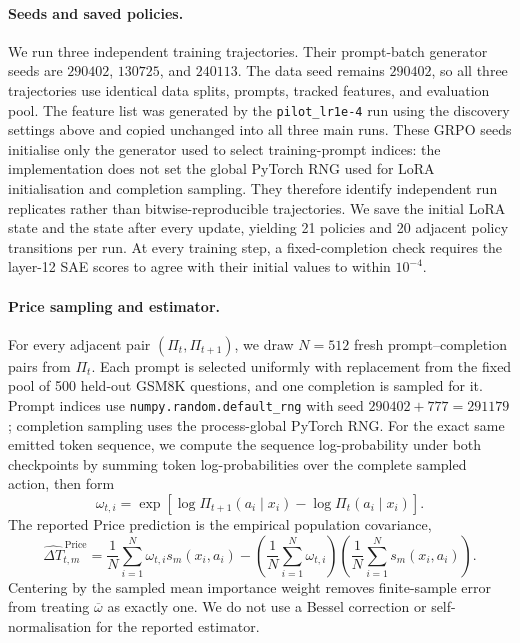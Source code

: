 \paragraph{Seeds and saved policies.}
We run three independent training trajectories.  Their prompt-batch generator
seeds are $290402$, $130725$, and $240113$.  The data seed remains $290402$,
so all three trajectories use identical data splits, prompts, tracked
features, and evaluation pool.  The feature list was generated by the
\texttt{pilot\_lr1e-4} run using the discovery settings above and copied
unchanged into all three main runs.  These GRPO seeds initialise only the
generator used to select training-prompt indices: the implementation does not
set the global PyTorch RNG used for LoRA initialisation and completion
sampling.  They therefore identify independent run replicates rather than
bitwise-reproducible trajectories.  We save the initial LoRA state and the
state after every update, yielding 21 policies and 20 adjacent policy
transitions per run.  At every training step, a fixed-completion check
requires the layer-12 SAE scores to agree with their initial values to within
$10^{-4}$.

\paragraph{Price sampling and estimator.}
For every adjacent pair $(\Pi_t,\Pi_{t+1})$, we draw $N=512$ fresh
prompt--completion pairs from $\Pi_t$.  Each prompt is selected uniformly
with replacement from the fixed pool of 500 held-out GSM8K questions, and
one completion is sampled for it.  Prompt indices use
\texttt{numpy.random.default\_rng} with seed $290402+777=291179$; completion
sampling uses the process-global PyTorch RNG.  For the exact same emitted
token sequence,
we compute the sequence log-probability under both checkpoints by summing
token log-probabilities over the complete sampled action, then form
\begin{equation*}
\omega_{t,i}
=
\exp\!\left[
\log\Pi_{t+1}(a_i\mid x_i)-\log\Pi_t(a_i\mid x_i)
\right].
\end{equation*}
The reported Price prediction is the empirical population covariance,
\begin{equation*}
\widehat{\Delta T}^{\,\mathrm{Price}}_{t,m}
=
\frac{1}{N}\sum_{i=1}^{N}\omega_{t,i}s_m(x_i,a_i)
-
\left(\frac{1}{N}\sum_{i=1}^{N}\omega_{t,i}\right)
\left(\frac{1}{N}\sum_{i=1}^{N}s_m(x_i,a_i)\right).
\end{equation*}
Centering by the sampled mean importance weight removes finite-sample error
from treating $\overline{\omega}$ as exactly one.  We do not use a Bessel
correction or self-normalisation for the reported estimator.

